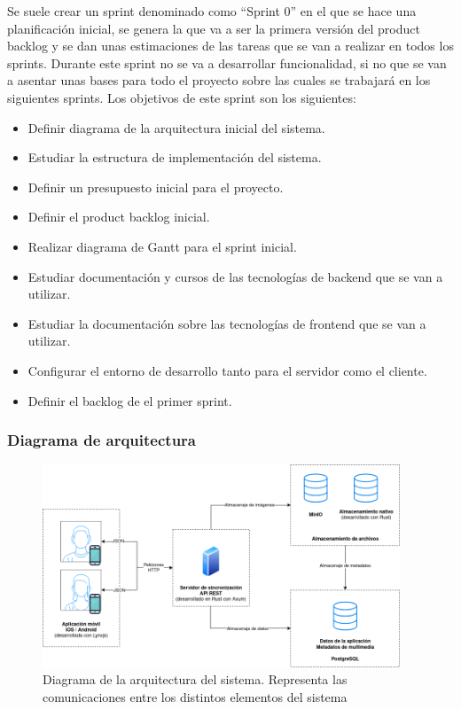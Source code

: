 Se suele crear un sprint denominado como ``Sprint 0'' en el que se hace una planificación inicial, se genera la que va a ser la primera versión del product backlog y se dan unas estimaciones de las tareas que se van a realizar en todos los sprints.
Durante este sprint no se va a desarrollar funcionalidad, si no que se van a asentar unas bases para todo el proyecto sobre las cuales se trabajará en los siguientes sprints.
Los objetivos de este sprint son los siguientes:

\begin{itemize}
    \item Definir diagrama de la arquitectura inicial del sistema.
    \item Estudiar la estructura de implementación del sistema.
    \item Definir un presupuesto inicial para el proyecto.
    \item Definir el product backlog inicial.
    \item Realizar diagrama de Gantt para el sprint inicial.
    \item Estudiar documentación y cursos de las tecnologías de backend que se van a utilizar.
    \item Estudiar la documentación sobre las tecnologías de frontend que se van a utilizar.
    \item Configurar el entorno de desarrollo tanto para el servidor como el cliente.
    \item Definir el backlog de el primer sprint.
\end{itemize}

\subsubsection{Diagrama de arquitectura}
\begin{figure}[H]
    \begin{center}
        \includegraphics[width=0.95\textwidth]{images/diagrama-arquitectura.png}
    \end{center}
    \caption{Diagrama de la arquitectura del sistema. Representa las comunicaciones entre los distintos elementos del sistema}\label{fig:diagrama-arquitectura}
\end{figure}

